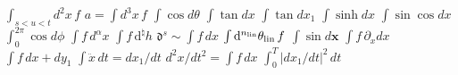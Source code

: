 \documentclass{article}
\begin{document}
$\int_{s<u<t}d^2x\,f$ $a=\int d^3x\,f$
$\int\cos d\theta$ $\int\tan dx$ $\int\tan dx_1$ $\int\sinh dx$ $\int\sin\cos dx$ $\int_0^{2\pi}\cos d\phi$
$\int f\,d^\alpha x$ $\int f\,\mathrm{d}^\natural h$ $\mathfrak{d}^{s}\sim\int f\,dx$ $\int{\rm d}^{n_{\mathrm{lin}}}\theta_{\mathrm{lin}}\,f$
$\int\sin d\mathbf{x}$ $\int f\,\partial_x dx$
$\int f\,dx+dy_1$ $\int\ddot{x}\,dt=dx_1/dt$ $d^2x/dt^2=\int f\,dx$ $\int_0^T|dx_1/dt|^2\,dt$
\end{document}

